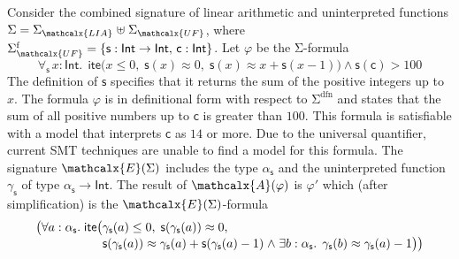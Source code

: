 \documentclass[runningheads,a4paper]{llncs}
\newcommand{\con}[1]{\mathsf{#1}}
\let\const=\con
\let\oldSigma=\Sigma
\def\Sigma{\mathrm{\oldSigma}}
\let\oldwedge=\wedge
\def\wedge{\mathrel{\oldwedge}}
\newcommand{\teq}{\approx}
\newcommand{\conv}{\mathcalx{A}}
\newcommand{\stypes}[1]{#1^\mathrm{ty}}
\newcommand{\sfuns}[1]{#1^\mathrm{f}}
\newcommand{\sfundefs}[1]{#1^\mathrm{dfn}}
\newcommand{\typeint}{\ty{Int}}
\newcommand\ty[1]{\con{#1}}
\newcommand{\lite}{\con{ite}}
\newcommand\concret{\gamma} %
\newcommand{\forallf}[1]{\forall_{\!#1\:}}
\newcommand{\farg}[1]{\concret_{#1}}
\newcommand{\fargtype}[1]{\alpha_{#1}}
\newcommand{\Sigmalia}{\Sigma_{\mathcalx{LIA}}}
\newcommand{\extendsig}[1]{\mathcalx{E}( #1 )}
\newcommand{\rem}[1]{\textcolor{red}{[#1]}}
\newcommand{\jb}[1]{\rem{#1 --jb}}
\newcommand{\ct}[1]{\rem{#1 --ct}}
\newcommand{\euf}{\ensuremath{\mathcalx{UF}}\xspace}
\begin{document}
\begin{example}
\label{ex:translation}
Consider the combined signature of linear arithmetic and uninterpreted
functions $\Sigma = \Sigmalia \mathrel{\uplus} \Sigma_{\euf}$, where
$\sfuns{\Sigma_{\euf}} = \{ \con{s} : { \typeint \rightarrow \typeint },\, \const{c} : { \typeint } \}$.
Let $\varphi$ be the $\Sigma$-formula
\begin{equation} \label{eq:ex-before}
\forallf{\con{s}} x : {\typeint}.\;\, \lite\bigl( x \leq 0,\; \con{s}(x) \teq 0,\;
  \con{s}( x ) \teq x + \con{s}( x - 1 ) \bigr) \wedge \con{s}( \con{c} ) > 100
\end{equation}
%
The definition of $\const{s}$ specifies that it returns the sum of the
positive integers up to $x$. The formula $\varphi$ is in definitional form with
respect to $\sfundefs{\Sigma}$ 
and states that the sum of all
positive numbers up to $\const{c}$ is greater than $100$. This formula is
satisfiable with a model that interprets $\const{c}$ as $14$ or more.
Due to the universal quantifier,
current SMT techniques
are unable to find
a model for this formula. The signature $\extendsig{\Sigma}$ includes the type
$\fargtype{\con{s}}$ and the uninterpreted function $\farg{\con{s}}$ of type $\fargtype{\con{s}}
\rightarrow \typeint$. The result of $\conv( \varphi )$ 
is $\varphi'$ which (after simplification) is the $\extendsig{\Sigma}$-formula
%
\begin{equation} \label{eq:ex-after}
\!\begin{aligned}[c]
  & \phantom{{\wedge}\; }\bigl(
      \forall a : \fargtype{\con{s}}.\; \lite\bigl(
        \!\begin{aligned}[t]
         &  \farg{\con{s}}( a ) \leq 0,\;
          \con{s}(\farg{\con{s}}( a )) \teq 0,\;
\\[-\jot]
  & \con{s}(\farg{\con{s}}( a )) \teq \farg{\con{s}}( a ) + \con{s}( \farg{\con{s}}( a )-1 )
    \wedge \exists b : {\fargtype{\con{s}}}.\;\, \farg{\con{s}}( b ) \teq \farg{\con{s}}( a )-1 \bigr) \bigr)

\end{aligned}
\end{aligned}
\end{equation}
\end{example}
\end{document}

